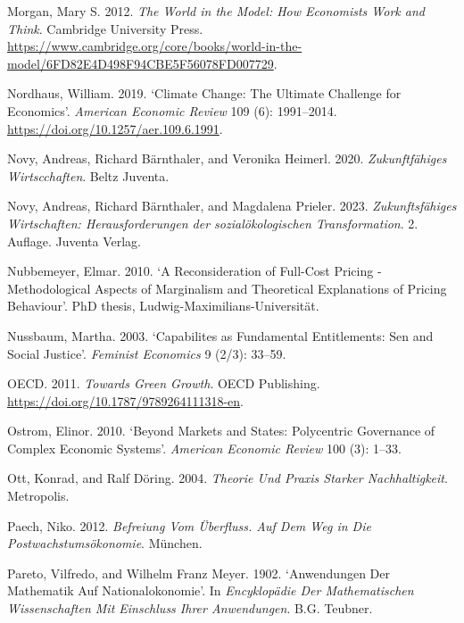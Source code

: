 \documentclass[
  british,
  a4paper,
  DIV=11,
  numbers=noendperiod,
  oneside,
  openany]{scrreprt}
\newlength{\cslhangindent}
\newenvironment{CSLReferences}[2] %
 {\begin{list}{}{%
  \setlength{\itemindent}{0pt}
  \setlength{\leftmargin}{0pt}
  \setlength{\parsep}{0pt}
  \ifodd #1
   \setlength{\leftmargin}{\cslhangindent}
   \setlength{\itemindent}{-1\cslhangindent}
  \fi
  \setlength{\itemsep}{#2\baselineskip}}}
 {\end{list}}
\begin{document}
\begin{CSLReferences}{1}{1}
Morgan, Mary S. 2012. \emph{The World in the Model: How Economists Work
and Think}. Cambridge University Press.
\url{https://www.cambridge.org/core/books/world-in-the-model/6FD82E4D498F94CBE5F56078FD007729}.

Nordhaus, William. 2019. {`Climate Change: The Ultimate Challenge for
Economics'}. \emph{American Economic Review} 109 (6): 1991--2014.
\url{https://doi.org/10.1257/aer.109.6.1991}.

Novy, Andreas, Richard Bärnthaler, and Veronika Heimerl. 2020.
\emph{Zukunftfähiges Wirtscchaften}. Beltz Juventa.

Novy, Andreas, Richard Bärnthaler, and Magdalena Prieler. 2023.
\emph{Zukunftsfähiges Wirtschaften: Herausforderungen der
sozialökologischen Transformation}. 2. Auflage. Juventa Verlag.

Nubbemeyer, Elmar. 2010. {`A Reconsideration of Full-Cost Pricing -
Methodological Aspects of Marginalism and Theoretical Explanations of
Pricing Behaviour'}. PhD thesis, Ludwig-Maximilians-Universität.

Nussbaum, Martha. 2003. {`Capabilites as Fundamental Entitlements: Sen
and Social Justice'}. \emph{Feminist Economics} 9 (2/3): 33--59.

OECD. 2011. \emph{Towards {Green} {Growth}}. OECD Publishing.
\url{https://doi.org/10.1787/9789264111318-en}.

Ostrom, Elinor. 2010. {`Beyond {Markets} and {States}: {Polycentric}
{Governance} of {Complex} {Economic} {Systems}'}. \emph{American
Economic Review} 100 (3): 1--33.

Ott, Konrad, and Ralf Döring. 2004. \emph{Theorie Und Praxis Starker
Nachhaltigkeit}. Metropolis.

Paech, Niko. 2012. \emph{Befreiung Vom Überfluss. Auf Dem Weg in Die
Postwachstumsökonomie}. München.

Pareto, Vilfredo, and Wilhelm Franz Meyer. 1902. {`Anwendungen Der
Mathematik Auf Nationalokonomie'}. In \emph{Encyklopädie Der
Mathematischen Wissenschaften Mit Einschluss Ihrer Anwendungen}. B.G.
Teubner.


\end{CSLReferences}
\end{document}
